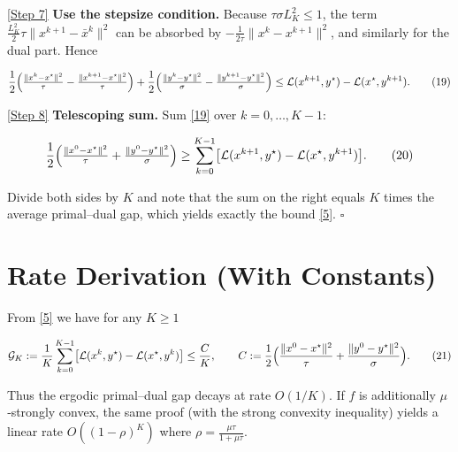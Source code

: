\documentclass{article}
\begin{document}
\noindent\underline{[Step 7]} \textbf{Use the stepsize condition.}  
Because $\tau\sigma L_K^{2}\le1$, the term $\frac{L_K^{2}}{2}\tau\|x^{k+1}-\bar x^{k}\|^{2}$ can be absorbed by $-\frac{1}{2\tau}\|x^{k}-x^{k+1}\|^{2}$, and similarly for the dual part.  Hence

\[
\frac{1}{2}\Bigl(\tfrac{\|x^{k}-x^{\star}\|^{2}}{\tau}
               -\tfrac{\|x^{k+1}-x^{\star}\|^{2}}{\tau}\Bigr)
+\frac{1}{2}\Bigl(\tfrac{\|y^{k}-y^{\star}\|^{2}}{\sigma}
               -\tfrac{\|y^{k+1}-y^{\star}\|^{2}}{\sigma}\Bigr)
\le \mathcal L(x^{k+1},y^{\star})-\mathcal L(x^{\star},y^{k+1}).
\tag{19}
\]

\noindent\underline{[Step 8]} \textbf{Telescoping sum.}  
Sum \eqref{19} over $k=0,\dots,K-1$:

\[
\frac{1}{2}\Bigl(\tfrac{\|x^{0}-x^{\star}\|^{2}}{\tau}
               +\tfrac{\|y^{0}-y^{\star}\|^{2}}{\sigma}\Bigr)
\ge \sum_{k=0}^{K-1}\bigl[\mathcal L(x^{k+1},y^{\star})
                         -\mathcal L(x^{\star},y^{k+1})\bigr].
\tag{20}
\]

Divide both sides by $K$ and note that the sum on the right equals
$K$ times the average primal–dual gap, which yields exactly the bound \eqref{5}.
\hfill $\square$

\section*{Rate Derivation (With Constants)}
From \eqref{5} we have for any $K\ge1$  

\[
\mathcal G_{K}:=
\frac{1}{K}\sum_{k=0}^{K-1}
\bigl[\mathcal L(x^{k},y^{\star})-\mathcal L(x^{\star},y^{k})\bigr]
\le
\frac{C}{K},
\qquad 
C:=\frac{1}{2}\Bigl(\frac{\|x^{0}-x^{\star}\|^{2}}{\tau}
                  +\frac{\|y^{0}-y^{\star}\|^{2}}{\sigma}\Bigr).
\tag{21}
\]

Thus the ergodic primal–dual gap decays at rate $O(1/K)$.  If $f$ is additionally $\mu$‑strongly convex, the same proof (with the strong convexity inequality) yields a linear rate $O((1-\rho)^{K})$ where $\rho=\frac{\mu\tau}{1+\mu\tau}$.
\end{document}
